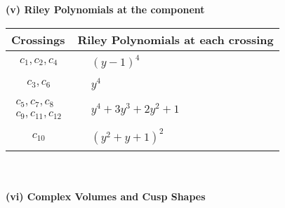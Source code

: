 \documentclass[1p]{elsarticle_modified}
\theoremstyle{definition}
\begin{document}
\newpage\renewcommand{\arraystretch}{1}
\flushleft \textbf{(v) Riley Polynomials at the component}\newline \\
\begin{tabular}{m{50pt}|m{274pt}}
Crossings & \hspace{64pt}Riley Polynomials at each crossing \\
\hline $$\begin{aligned}c_{1},c_{2},c_{4}\end{aligned}$$&$\begin{aligned}
&(y-1)^4
\end{aligned}$\\
\hline $$\begin{aligned}c_{3},c_{6}\end{aligned}$$&$\begin{aligned}
&y^4
\end{aligned}$\\
\hline $$\begin{aligned}c_{5},c_{7},c_{8}\\c_{9},c_{11},c_{12}\end{aligned}$$&$\begin{aligned}
&y^4+3 y^3+2 y^2+1
\end{aligned}$\\
\hline $$\begin{aligned}c_{10}\end{aligned}$$&$\begin{aligned}
&(y^2+y+1)^2
\end{aligned}$\\
\hline
\end{tabular}\\~\\
\newpage\flushleft \textbf{(vi) Complex Volumes and Cusp Shapes}
\end{document}
